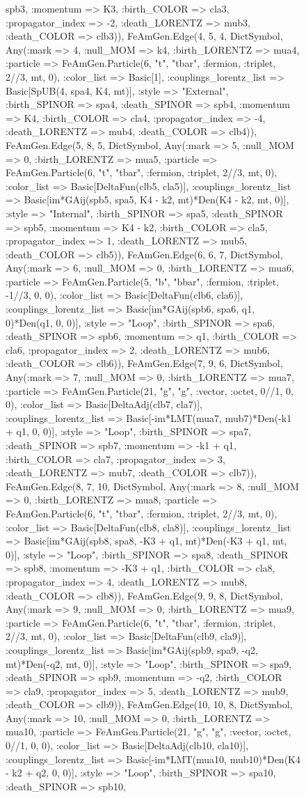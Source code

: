 \documentclass{revtex4}
\begin{document}
\begin{figure}[!htb]
\begin{center}
{spb3, :momentum => K3, :birth_COLOR => cla3, :propagator_index => -2, :death_LORENTZ => mub3, :death_COLOR => clb3)), FeAmGen.Edge(4, 5, 4, Dict{Symbol, Any}(:mark => 4, :null_MOM => k4, :birth_LORENTZ => mua4, :particle => FeAmGen.Particle(6, "t", "tbar", :fermion, :triplet, 2//3, mt, 0), :color_list => Basic[1], :couplings_lorentz_list => Basic[SpUB(4, spa4, K4, mt)], :style => "External", :birth_SPINOR => spa4, :death_SPINOR => spb4, :momentum => K4, :birth_COLOR => cla4, :propagator_index => -4, :death_LORENTZ => mub4, :death_COLOR => clb4)), FeAmGen.Edge(5, 8, 5, Dict{Symbol, Any}(:mark => 5, :null_MOM => 0, :birth_LORENTZ => mua5, :particle => FeAmGen.Particle(6, "t", "tbar", :fermion, :triplet, 2//3, mt, 0), :color_list => Basic[DeltaFun(clb5, cla5)], :couplings_lorentz_list => Basic[im*GAij(spb5, spa5, K4 - k2, mt)*Den(K4 - k2, mt, 0)], :style => "Internal", :birth_SPINOR => spa5, :death_SPINOR => spb5, :momentum => K4 - k2, :birth_COLOR => cla5, :propagator_index => 1, :death_LORENTZ => mub5, :death_COLOR => clb5)), FeAmGen.Edge(6, 6, 7, Dict{Symbol, Any}(:mark => 6, :null_MOM => 0, :birth_LORENTZ => mua6, :particle => FeAmGen.Particle(5, "b", "bbar", :fermion, :triplet, -1//3, 0, 0), :color_list => Basic[DeltaFun(clb6, cla6)], :couplings_lorentz_list => Basic[im*GAij(spb6, spa6, q1, 0)*Den(q1, 0, 0)], :style => "Loop", :birth_SPINOR => spa6, :death_SPINOR => spb6, :momentum => q1, :birth_COLOR => cla6, :propagator_index => 2, :death_LORENTZ => mub6, :death_COLOR => clb6)), FeAmGen.Edge(7, 9, 6, Dict{Symbol, Any}(:mark => 7, :null_MOM => 0, :birth_LORENTZ => mua7, :particle => FeAmGen.Particle(21, "g", "g", :vector, :octet, 0//1, 0, 0), :color_list => Basic[DeltaAdj(clb7, cla7)], :couplings_lorentz_list => Basic[-im*LMT(mua7, mub7)*Den(-k1 + q1, 0, 0)], :style => "Loop", :birth_SPINOR => spa7, :death_SPINOR => spb7, :momentum => -k1 + q1, :birth_COLOR => cla7, :propagator_index => 3, :death_LORENTZ => mub7, :death_COLOR => clb7)), FeAmGen.Edge(8, 7, 10, Dict{Symbol, Any}(:mark => 8, :null_MOM => 0, :birth_LORENTZ => mua8, :particle => FeAmGen.Particle(6, "t", "tbar", :fermion, :triplet, 2//3, mt, 0), :color_list => Basic[DeltaFun(clb8, cla8)], :couplings_lorentz_list => Basic[im*GAij(spb8, spa8, -K3 + q1, mt)*Den(-K3 + q1, mt, 0)], :style => "Loop", :birth_SPINOR => spa8, :death_SPINOR => spb8, :momentum => -K3 + q1, :birth_COLOR => cla8, :propagator_index => 4, :death_LORENTZ => mub8, :death_COLOR => clb8)), FeAmGen.Edge(9, 9, 8, Dict{Symbol, Any}(:mark => 9, :null_MOM => 0, :birth_LORENTZ => mua9, :particle => FeAmGen.Particle(6, "t", "tbar", :fermion, :triplet, 2//3, mt, 0), :color_list => Basic[DeltaFun(clb9, cla9)], :couplings_lorentz_list => Basic[im*GAij(spb9, spa9, -q2, mt)*Den(-q2, mt, 0)], :style => "Loop", :birth_SPINOR => spa9, :death_SPINOR => spb9, :momentum => -q2, :birth_COLOR => cla9, :propagator_index => 5, :death_LORENTZ => mub9, :death_COLOR => clb9)), FeAmGen.Edge(10, 10, 8, Dict{Symbol, Any}(:mark => 10, :null_MOM => 0, :birth_LORENTZ => mua10, :particle => FeAmGen.Particle(21, "g", "g", :vector, :octet, 0//1, 0, 0), :color_list => Basic[DeltaAdj(clb10, cla10)], :couplings_lorentz_list => Basic[-im*LMT(mua10, mub10)*Den(K4 - k2 + q2, 0, 0)], :style => "Loop", :birth_SPINOR => spa10, :death_SPINOR => spb10, }
\end{center}
\end{figure}
\end{document}

